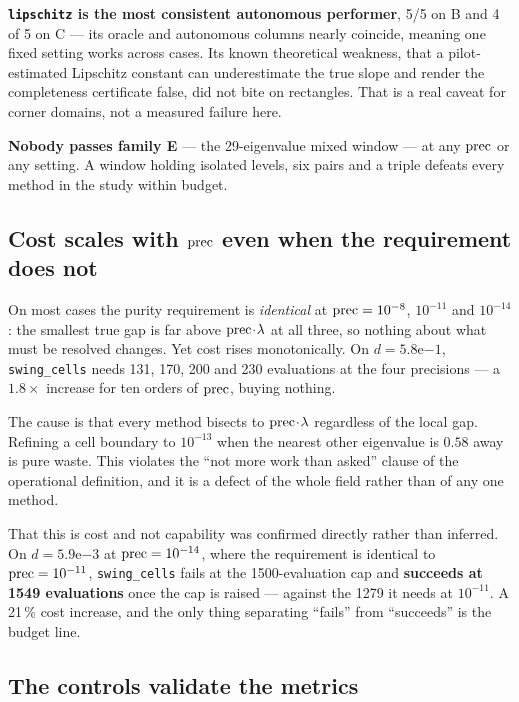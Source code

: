 \textbf{\texttt{lipschitz} is the most consistent autonomous performer}, 5/5 on B and 4 of 5
on C --- its oracle and autonomous columns nearly coincide, meaning one fixed setting works
across cases. Its known theoretical weakness, that a pilot-estimated Lipschitz constant can
underestimate the true slope and render the completeness certificate false, did not bite on
rectangles. That is a real caveat for corner domains, not a measured failure here.

\textbf{Nobody passes family E} --- the 29-eigenvalue mixed window --- at any $\mathrm{prec}$ or any
setting. A window holding isolated levels, six pairs and a triple defeats every method in the
study within budget.

\subsection{Cost scales with \texorpdfstring{$\mathrm{prec}$}{prec} even when the requirement does not}

On most cases the purity requirement is \emph{identical} at $\mathrm{prec} = 10^{-8}$, $10^{-11}$ and
$10^{-14}$: the smallest true gap is far above $\mathrm{prec}\!\cdot\!\lambda$ at all three, so nothing about
what must be resolved changes. Yet cost rises monotonically. On $d = 5.8\mathrm{e}{-1}$,
\texttt{swing\_cells} needs 131, 170, 200 and 230 evaluations at the four precisions --- a
$1.8\times$ increase for ten orders of $\mathrm{prec}$, buying nothing.

The cause is that every method bisects to $\mathrm{prec}\!\cdot\!\lambda$ regardless of the local gap.
Refining a cell boundary to $10^{-13}$ when the nearest other eigenvalue is $0.58$ away is pure
waste. This violates the ``not more work than asked'' clause of the operational definition, and
it is a defect of the whole field rather than of any one method.

That this is cost and not capability was confirmed directly rather than inferred. On
$d = 5.9\mathrm{e}{-3}$ at $\mathrm{prec} = 10^{-14}$, where the requirement is identical to
$\mathrm{prec} = 10^{-11}$, \texttt{swing\_cells} fails at the 1500-evaluation cap and \textbf{succeeds at
1549 evaluations} once the cap is raised --- against the 1279 it needs at $10^{-11}$. A
21\,\% cost increase, and the only thing separating ``fails'' from ``succeeds'' is the budget
line.

\subsection{The controls validate the metrics}

